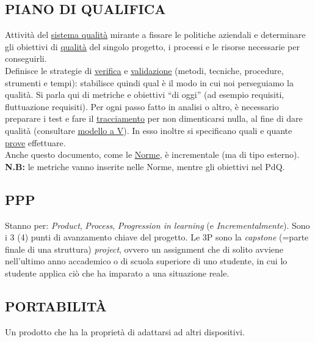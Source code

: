 		\subsection{PIANO DI QUALIFICA}		\label{pianoqualifica}	%
		Attività del \underline{\hyperref[sistemadiqualita]{sistema qualità}} mirante a fissare le politiche aziendali e determinare gli obiettivi di \underline{\hyperref[qualita]{qualità}} del singolo progetto, i processi e le risorse necessarie per conseguirli. \\
		Definisce le strategie di \underline{\hyperref[verificare]{verifica}} e \underline{\hyperref[validare]{validazione}} (metodi, tecniche, procedure, strumenti e tempi): stabilisce quindi qual è il modo in cui noi perseguiamo la qualità.
		Si parla qui di metriche e obiettivi ``di oggi'' (ad esempio requisiti, fluttuazione requisiti).
		Per ogni passo fatto in analisi o altro, è necessario preparare i test e fare il \underline{\hyperref[tracciamento]{tracciamento}} per non dimenticarsi nulla, al fine di dare qualità (consultare \underline{\hyperref[V]{modello a V}}).
		In esso inoltre si specificano quali e quante \underline{\hyperref[prova]{prove}} effettuare. \\
		Anche questo documento, come le \underline{\hyperref[norme]{Norme}}, è incrementale (ma di tipo esterno). \\
		\textbf{N.B:} le metriche vanno inserite nelle Norme, mentre gli obiettivi nel PdQ.


		\subsection{PPP}		\label{3p}
		Stanno per: \textit{Product}, \textit{Process}, \textit{Progression in learning} (e \textit{Incrementalmente}). Sono i 3 (4) punti di avanzamento chiave del progetto. Le 3P sono la \textit{capstone} (=parte finale di una struttura) \textit{project}, ovvero un assignment che di solito avviene nell'ultimo anno accademico o di scuola superiore di uno studente, in cui lo studente applica ciò che ha imparato a una situazione reale.


		\subsection{PORTABILITÀ}		\label{portabilita}
		Un prodotto che ha la proprietà di adattarsi ad altri dispositivi.


